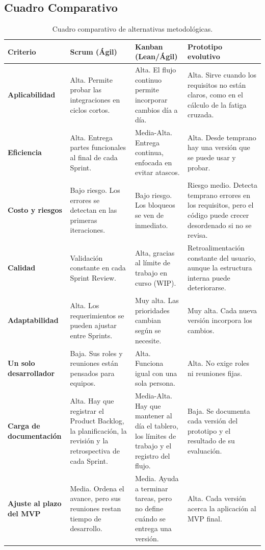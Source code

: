 \subsection{Cuadro Comparativo}
\begin{table}[h!]
    \centering
    \renewcommand{\arraystretch}{1.4}
    \begin{tabular}{|m{3cm}|m{4cm}|m{4cm}|m{4cm}|}
        \hline
        \rowcolor[HTML]{EFEFEF}
        \textbf{Criterio} & \textbf{Scrum (Ágil)} & \textbf{Kanban (Lean/Ágil)} & \textbf{Prototipo evolutivo} \\ \hline
        \textbf{Aplicabilidad} & Alta. Permite probar las integraciones en ciclos cortos. & Alta. El flujo continuo permite incorporar cambios día a día. & Alta. Sirve cuando los requisitos no están claros, como en el cálculo de la fatiga cruzada. \\ \hline
        \textbf{Eficiencia} & Alta. Entrega partes funcionales al final de cada Sprint. & Media-Alta. Entrega continua, enfocada en evitar atascos. & Alta. Desde temprano hay una versión que se puede usar y probar. \\ \hline
        \textbf{Costo y riesgos} & Bajo riesgo. Los errores se detectan en las primeras iteraciones. & Bajo riesgo. Los bloqueos se ven de inmediato. & Riesgo medio. Detecta temprano errores en los requisitos, pero el código puede crecer desordenado si no se revisa. \\ \hline
        \textbf{Calidad} & Validación constante en cada Sprint Review. & Alta, gracias al límite de trabajo en curso (WIP). & Retroalimentación constante del usuario, aunque la estructura interna puede deteriorarse. \\ \hline
        \textbf{Adaptabilidad} & Alta. Los requerimientos se pueden ajustar entre Sprints. & Muy alta. Las prioridades cambian según se necesite. & Muy alta. Cada nueva versión incorpora los cambios. \\ \hline
        \textbf{Un solo desarrollador} & Baja. Sus roles y reuniones están pensados para equipos. & Alta. Funciona igual con una sola persona. & Alta. No exige roles ni reuniones fijas. \\ \hline
        \textbf{Carga de documentación} & Alta. Hay que registrar el Product Backlog, la planificación, la revisión y la retrospectiva de cada Sprint. & Media-Alta. Hay que mantener al día el tablero, los límites de trabajo y el registro del flujo. & Baja. Se documenta cada versión del prototipo y el resultado de su evaluación. \\ \hline
        \textbf{Ajuste al plazo del MVP} & Media. Ordena el avance, pero sus reuniones restan tiempo de desarrollo. & Media. Ayuda a terminar tareas, pero no define cuándo se entrega una versión. & Alta. Cada versión acerca la aplicación al MVP final. \\ \hline
    \end{tabular}
    \caption{Cuadro comparativo de alternativas metodológicas.}
    \label{tab:comparativa_metodologias}
\end{table}
\newpage
